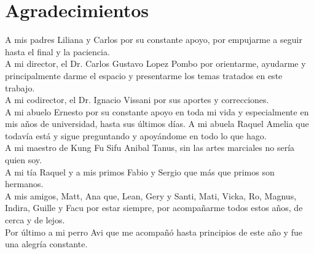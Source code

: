 \chapter*{Agradecimientos}

A mis padres Liliana y Carlos por su constante apoyo, por empujarme a seguir hasta el final y la paciencia.\\
A mi director, el Dr. Carlos Gustavo Lopez Pombo por orientarme, ayudarme y principalmente darme el espacio y presentarme los temas tratados en este trabajo.\\
A mi codirector, el Dr. Ignacio Vissani por sus aportes y correcciones.\\
A mi abuelo Ernesto por su constante apoyo en toda mi vida y especialmente en mis años de universidad, hasta sus últimos días. A mi abuela Raquel Amelia que todavía está y sigue preguntando y apoyándome en todo lo que hago.\\
A mi maestro de Kung Fu Sifu Anibal Tanus, sin las artes marciales no sería quien soy.\\
A mi tía Raquel y a mis primos Fabio y Sergio que más que primos son hermanos. \\
A mis amigos, Matt, Ana que, Lean, Gery y Santi, Mati, Vicka, Ro, Magnus, Indira, Guille y Facu por estar siempre, por acompañarme todos estos años, de cerca y de lejos.\\
Por último a mi perro Avi que me acompañó hasta principios de este año y fue una alegría constante.